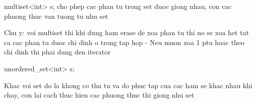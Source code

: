     multiset<int> s;   cho phep cac phan tu trong set duoc giong nhau, con cac phuong thuc van tuong tu nhu set

    Chu y: voi multiset thi khi dung ham erase de xoa phan tu thi no se xoa het tat ca cac phan tu duoc chi dinh o trong tap hop
        - Neu muon xoa 1 ptu hoac theo chi dinh thi phai dung den iterator

    unordered_set<int> s;

    Khac voi set do la khong co thu tu va do phuc tap cua cac ham se khac nhau khi chay, con lai cach thuc hien cac phuong thuc thi giong nhu set